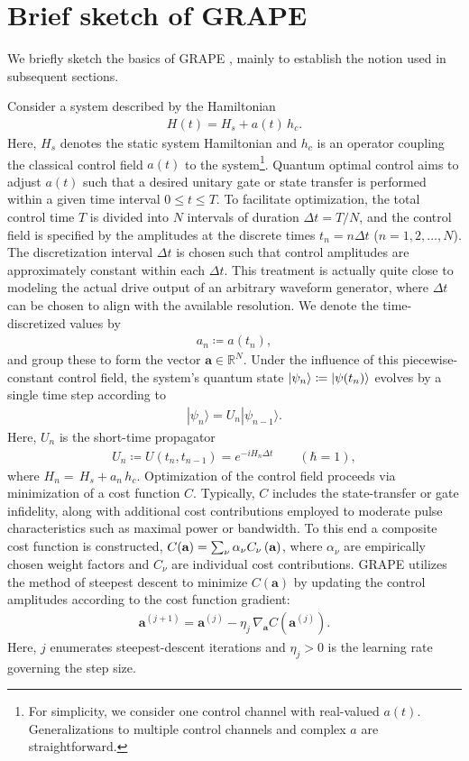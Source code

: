 \section{Brief sketch of GRAPE \label{grapetheory}}
We briefly sketch the basics of GRAPE \cite{nmrkhaneja2005optimal}, mainly to establish the notion used in subsequent sections. 

Consider a system described by the Hamiltonian
\begin{align}
     H(t) = H_s + a(t)\, h_c.
\end{align}
Here, $H_s$ denotes the static system Hamiltonian and $h_c$ is an operator coupling the classical control field $a(t)$ to the system\footnote{For simplicity, we consider one control channel with real-valued $a(t)$. Generalizations to multiple control channels and complex $a$ are straightforward.}. Quantum optimal control aims to adjust $a(t)$ such that a desired unitary gate or state transfer is performed within a given time interval $0\le t \le T$. To facilitate optimization, the total control time $T$ is divided into $N$ intervals of duration $\Delta t=T/N$, and the control field is specified by the amplitudes at the discrete times $t_n=n\Delta t$ ($n=1,2,\dots,N$). The discretization interval $\Delta t$ is chosen such that control amplitudes are approximately constant within each $\Delta t$. This treatment is actually quite close to modeling the actual drive output of an arbitrary waveform generator, where $\Delta t$ can be chosen to align with the available resolution. We denote the time-discretized values by
\begin{align}
\label{eq2}
    a_n \coloneqq a(t_n),
\end{align}
and group these to form the vector $\textbf{a}\in \mathbb{R}^{N}$.  
Under the influence of this piecewise-constant control field, the system's quantum state $|\psi_n\rangle\coloneqq |\psi(t_n)\rangle$ evolves by a single time step according to 
\begin{align}
\label{statepropagation}
  |\psi_n\rangle=U_n|\psi_{n-1}\rangle.
\end{align}
Here, $U_n$ is the short-time propagator
\begin{align}
\label{propagator}
  U_n\coloneqq U(t_n, t_{n-1}) =e^{-iH_n\Delta t}\qquad(\hbar=1),
\end{align}
where $H_n=\, H_s+a_n\, h_c $. Optimization of the control field proceeds via minimization of a cost function $C$. Typically, $C$ includes the state-transfer or gate infidelity, along with additional cost contributions employed to moderate pulse characteristics such as maximal power or bandwidth. To this end a composite cost function is constructed, $C(\textbf{a})=\sum_{\nu}\alpha_\nu C_\nu \left(\textbf{a}\right)$, where $\alpha_\nu$ are empirically chosen weight factors and $C_\nu$ are individual cost contributions. GRAPE utilizes the method of steepest descent to minimize $C(\textbf{a})$ by updating the control amplitudes according to the cost function gradient: 
\begin{align}
  \textbf{a}^{(j+1)}=\textbf{a}^{(j)}-\eta_j\,\nabla_{\textbf{a}}C(\textbf{a}^{(j)}).
\end{align}
Here, $j$ enumerates steepest-descent iterations and $\eta_j>0$ is the learning rate governing the step size. 

